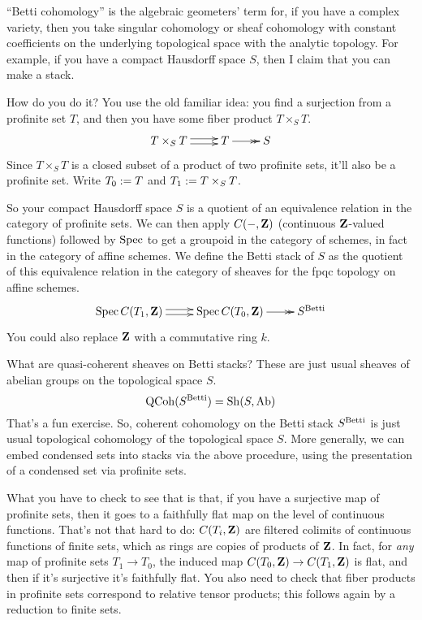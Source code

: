 \begin{example}
  ``Betti cohomology'' is the algebraic geometers' term for, if you have a complex variety, then you take singular cohomology or sheaf cohomology with constant coefficients on the underlying topological space with the analytic topology. For example, if you have a compact Hausdorff space $S$, then I claim that you can make a stack.
  
  How do you do it? You use the old familiar idea: you find a surjection from a profinite set $T$, and then you have some fiber product $T\times_S T$.
  \[\xymatrix{
    T\times_S T \ar@<-.5ex>[r] \ar@<.5ex>[r] & T \ar@{->>}[r] & S
  }\]
  Since $T\times_S T$ is a closed subset of a product of two profinite sets, it'll also be a profinite set. Write $T_0\mathrel{:=} T$ and $T_1\mathrel{:=} T\times_S T$.
  
  So your compact Hausdorff space $S$ is a quotient of an equivalence relation in the category of profinite sets. We can then apply $C(-,\mathbf Z)$ (continuous $\mathbf Z$-valued functions) followed by $\operatorname{Spec}$ to get a groupoid in the category of schemes, in fact in the category of affine schemes. We define the Betti stack of $S$ as the quotient of this equivalence relation in the category of sheaves for the fpqc topology on affine schemes. 
  \[\xymatrix{
    \Spec C(T_1,\Z) \ar@<-.5ex>[r] \ar@<.5ex>[r] & \Spec C(T_0,\Z) \ar@{->>}[r] & S^\Betti
  }\]
  You could also replace $\mathbf Z$ with a commutative ring $k$.

  What are quasi-coherent sheaves on Betti stacks? These are just usual sheaves of abelian groups on the topological space $S$.
  \[ \operatorname{QCoh}(S^{\text{Betti}}) = \operatorname{Sh}(S,\mathrm{Ab}) \]
  That's a fun exercise. So, coherent cohomology on the Betti stack $S^{\text{Betti}}$ is just usual topological cohomology of the topological space $S$. More generally, we can embed condensed sets into stacks via the above procedure, using the presentation of a condensed set via profinite sets.


  What you have to check to see that is that, if you have a surjective map of profinite sets, then it goes to a faithfully flat map on the level of continuous functions. That's not that hard to do: $C(T_i,\mathbf Z)$ are filtered colimits of continuous functions of finite sets, which as rings are copies of products of $\mathbf Z$. In fact, for \emph{any} map of profinite sets $T_1\to T_0$, the induced map $C(T_0,\mathbf Z)\to C(T_1,\mathbf Z)$ is flat, and then if it's surjective it's faithfully flat. You also need to check that fiber products in profinite sets correspond to relative tensor products; this follows again by a reduction to finite sets.
\end{example}

